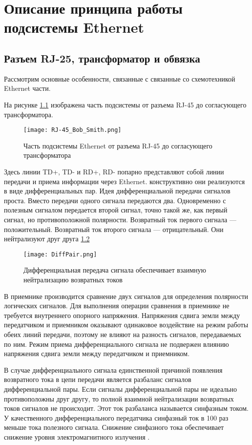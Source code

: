 \chapter{Описание принципа работы подсистемы Ethernet}
\section{Разъем RJ-25, трансформатор и обвязка}
\hspace{1cm} 

Рассмотрим основные особенности, связанные с связанные со схемотехникой Ethernet части. 

На рисунке \ref{ris:RJ-45} изображена часть подсистемы от разъема RJ-45 до согласующего трансформатора. 

\begin{figure}[H]
\centering
\texttt{[image: RJ-45\_Bob\_Smith.png]}
\caption{Часть подсистемы Ethernet от разъема RJ-45 до согласующего трансформатора}
\label{ris:RJ-45}
\end{figure}

Здесь линии TD+, TD- и RD+, RD- попарно представляют собой линии передачи и приема информации через Ethernet. 
конструктивно они реализуются в виде дифференциальных пар. 
Идея дифференциальной передачи сигналов проста. Вместо передачи одного
сигнала передаются два. Одновременно с полезным сигналом передается второй
сигнал, точно такой же, как первый сигнал, но противоположной полярности.
Возвратный ток первого сигнала — положительный. Возвратный ток второго сигнала — 
отрицательный. Они нейтрализуют друг друга \ref{ris:DiffPair}

\begin{figure}[H]
\centering
\texttt{[image: DiffPair.png]}
\caption{Дифференциальная передача сигнала обеспечивает взаимную нейтрализацию
возвратных токов}
\label{ris:DiffPair}
\end{figure}

В приемнике производится сравнение двух сигналов для определения полярности логических сигналов. Для 
выполнения операции сравнения в приемнике не требуется внутреннего опорного напряжения. Напряжения сдвига земли
между передатчиком и приемником оказывают одинаковое воздействие на режим работы
обеих линий передачи, поэтому не влияют на разность сигналов, передаваемых по ним. 
Режим приема дифференциального сигнала не подвержен влиянию напряжения сдвига земли между передатчиком и 
приемником.

В случае дифференциального сигнала единственной причиной появления возвратного тока в цепи передачи является 
разбаланс сигналов дифференциальной пары. Если сигналы дифференциальной пары не идеально противоположны друг
другу, то полной взаимной нейтрализации возвратных токов сигналов не происходит. Этот ток разбаланса называется 
синфазным током. У качественного дифференциального передатчика синфазный ток в 100 раз меньше тока полезного
сигнала. Снижение синфазного тока обеспечивает снижение уровня электромагнитного излучения 
\cite{Howard J: Start Black Magic}.

